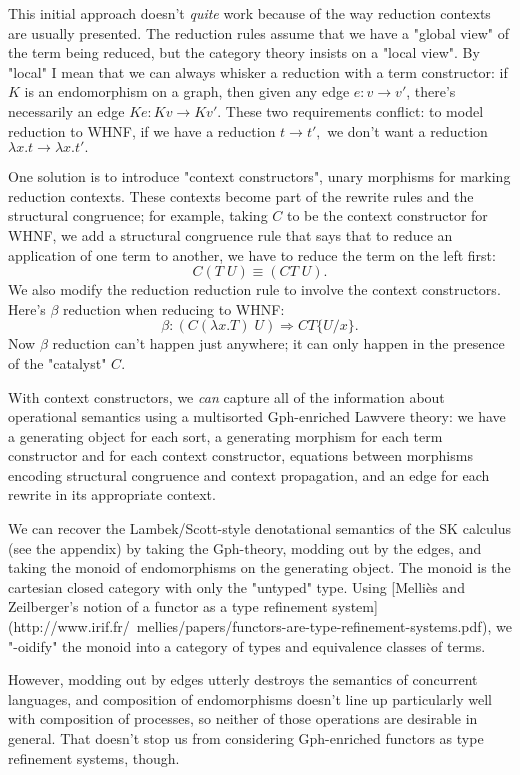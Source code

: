 \documentclass[a4paper,UKenglish]{article}
\begin{document}
This initial approach doesn't {\em quite} work because of the way reduction contexts are usually presented.  The reduction rules assume that we have a "global view" of the term being reduced, but the category theory insists on a "local view".  By "local" I mean that we can always whisker a reduction with a term constructor: if $K$ is an endomorphism on a graph, then given any edge $e:v\to v'$, there's necessarily an edge $Ke:Kv \to Kv'.$  These two requirements conflict: to model reduction to WHNF, if we have a reduction $t \to t',$ we don't want a reduction $\lambda x.t \to \lambda x.t'.$

One solution is to introduce "context constructors", unary morphisms for marking reduction contexts.  These contexts become part of the rewrite rules and the structural congruence; for example, taking $C$ to be the context constructor for WHNF, we add a structural congruence rule that says that to reduce an application of one term to another, we have to reduce the term on the left first: $$C(T\; U) \equiv (CT\; U).$$
We also modify the reduction reduction rule to involve the context constructors.  Here's $\beta$ reduction when reducing to WHNF: $$ \beta: (C(\lambda x.T)\; U) \Rightarrow CT\{U/x\}. $$
Now $\beta$ reduction can't happen just anywhere; it can only happen in the presence of the "catalyst" $C$.

With context constructors, we {\em can} capture all of the information about operational semantics using a multisorted Gph-enriched Lawvere theory: we have a generating object for each sort, a generating morphism for each term constructor and for each context constructor, equations between morphisms encoding structural congruence and context propagation, and an edge for each rewrite in its appropriate context.


We can recover the Lambek/Scott-style denotational semantics of the SK calculus (see the appendix) by taking the Gph-theory, modding out by the edges, and taking the monoid of endomorphisms on the generating object.  The monoid is the cartesian closed category with only the "untyped" type.  Using [Melliès and Zeilberger's notion of a functor
as a type refinement system](http://www.irif.fr/~mellies/papers/functors-are-type-refinement-systems.pdf), we "-oidify" the monoid into a category of types and equivalence classes of terms.

However, modding out by edges utterly destroys the semantics of concurrent languages, and composition of endomorphisms doesn't line up particularly well with composition of processes, so neither of those operations are desirable in general.  That doesn't stop us from considering Gph-enriched functors as type refinement systems, though.
\end{document}

